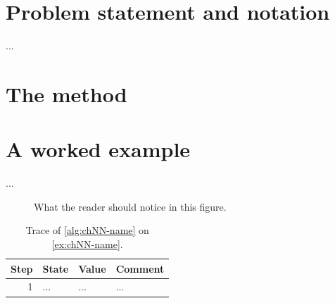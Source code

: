 \section{Problem statement and notation}
\label{sec:chNN-problem}
\begin{definition}[Name]
\label{def:chNN-name}
...
\end{definition}

\section{The method}
\label{sec:chNN-algorithm}
\begin{algorithm}[htb]
\caption{Method name}
\label{alg:chNN-name}
\end{algorithm}

\section{A worked example}
\label{sec:chNN-example}
\begin{example}
\label{ex:chNN-name}
...
\end{example}
\begin{figure}[tb]
  \centering
  \caption{What the reader should notice in this figure.}
  \label{fig:chNN-example}
\end{figure}
\begin{table}[tb]
  \centering\small
  \caption{Trace of \cref{alg:chNN-name} on \cref{ex:chNN-name}.}
  \label{tab:chNN-trace}
  \begin{tabular}{@{}rlll@{}}
  \toprule
  Step & State & Value & Comment\\
  \midrule
  1 & ... & ... & ...\\
  \bottomrule
  \end{tabular}
\end{table}

